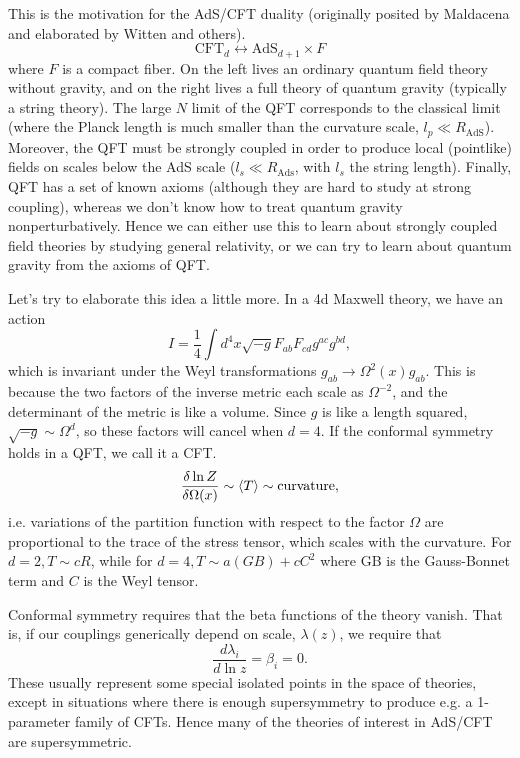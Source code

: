 This is the motivation for the AdS/CFT duality (originally posited by Maldacena and elaborated by Witten and others).
\begin{equation}
    \text{CFT}_d \leftrightarrow \text{AdS}_{d+1} \times F
\end{equation}
where $F$ is a compact fiber. On the left lives an ordinary quantum field theory without gravity, and on the right lives a full theory of quantum gravity (typically a string theory). The large $N$ limit of the QFT corresponds to the classical limit (where the Planck length is much smaller than the curvature scale, $l_p \ll R_\text{AdS}$). Moreover, the QFT must be strongly coupled in order to produce local (pointlike) fields on scales below the AdS scale ($l_s \ll R_\text{Ads}$, with $l_s$ the string length). Finally, QFT has a set of known axioms (although they are hard to study at strong coupling), whereas we don't know how to treat quantum gravity nonperturbatively. Hence we can either use this to learn about strongly coupled field theories by studying general relativity, or we can try to learn about quantum gravity from the axioms of QFT.

Let's try to elaborate this idea a little more. In a 4d Maxwell theory, we have an action
\begin{equation}
    I=\frac{1}{4} \int d^4x \sqrt{-g} F_{ab} F_{cd} g^{ac} g^{bd},
\end{equation}
which is invariant under the Weyl transformations $g_{ab} \to \Omega^2(x) g_{ab}$. This is because the two factors of the inverse metric each scale as $\Omega^{-2}$, and the determinant of the metric is like a volume. Since $g$ is like a length squared, $\sqrt{-g} \sim \Omega^d$, so these factors will cancel when $d=4$. If the conformal symmetry holds in a QFT, we call it a CFT.
\begin{equation}
    \frac{\delta \ln Z}{\delta \Omega(x)} \sim \left< T \right> \sim \text{curvature},
\end{equation}
i.e. variations of the partition function with respect to the factor $\Omega$ are proportional to the trace of the stress tensor, which scales with the curvature. For $d=2, T\sim cR$, while for $d=4, T\sim a(GB)+ cC^2$ where GB is the Gauss-Bonnet term and $C$ is the Weyl tensor.

Conformal symmetry requires that the beta functions of the theory vanish. That is, if our couplings generically depend on scale, $\lambda(z)$, we require that
\begin{equation}
    \frac{d\lambda_i}{d\ln z} =\beta_i =0.
\end{equation}
These usually represent some special isolated points in the space of theories, except in situations where there is enough supersymmetry to produce e.g. a 1-parameter family of CFTs. Hence many of the theories of interest in AdS/CFT are supersymmetric.